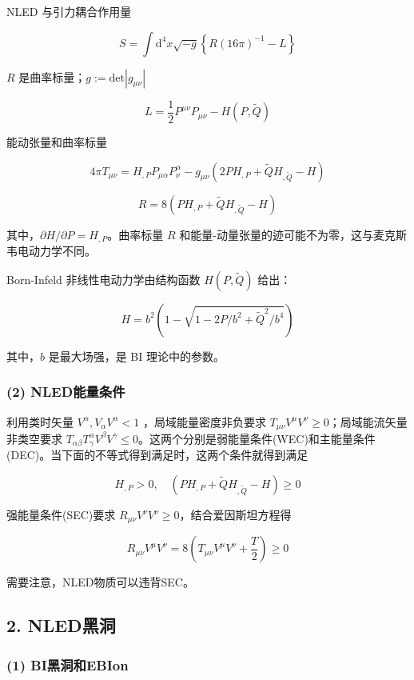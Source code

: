 \documentclass[aps,prl,preprint,groupedaddress]{revtex4-2}
\begin{document}
NLED 与引力耦合作用量

$$
S
=\int \mathrm{d}^4 x\sqrt{-g} \left\{R(16\pi)^{-1}-L \right\}
$$

$R $ 是曲率标量；$g:=\mathrm{det}\left|g_{\mu\nu} \right| $

$$
L
=\frac{1 }{2 } P^{\mu\nu}P_{\mu\nu} - H\left(P,\tilde{Q} \right)
$$

能动张量和曲率标量

$$
4\pi T_{\mu\nu}
=H_{,P} P_{\mu\alpha} P_\nu^\alpha - g_{\mu\nu}\left(2P H_{,P} + \tilde{Q} H_{,\tilde{Q}} - H \right)
$$

$$
R
=8\left(P H_{,P} + \tilde{Q} H_{,\tilde{Q}} - H \right) 
$$

其中，$\partial H/\partial P = H_{,P} $。曲率标量 $R$ 和能量-动量张量的迹可能不为零，这与麦克斯韦电动力学不同。

Born-Infeld 非线性电动力学由结构函数 $H(P,\tilde{Q}) $ 给出：

$$
H = b^2\left(1-\sqrt{1-2P/b^2+\tilde{Q}^2/b^4} \right) 
$$

其中，$b $ 是最大场强，是 BI 理论中的参数。

\subsubsection{(2) NLED能量条件}

利用类时矢量 $V^\alpha,V_\alpha V^\alpha<1 $ ，局域能量密度非负要求 $T_{\mu\nu}V^\mu V^\nu\geq 0 $；局域能流矢量非类空要求 $T_{\alpha\beta}T_\gamma^\alpha V^\beta V^\gamma\leq 0 $。这两个分别是弱能量条件(WEC)和主能量条件(DEC)。当下面的不等式得到满足时，这两个条件就得到满足

$$
H_{,P}>0,\quad
\left(P H_{,P} + \tilde{Q} H_{,\tilde{Q}} - H \right) \geq 0
$$

强能量条件(SEC)要求 $R_{\mu\nu}V^\nu V^\nu\geq 0 $，结合爱因斯坦方程得

$$
R_{\mu\nu}V^\mu V^\nu 
=8\left(T_{\mu\nu} V^\mu V^\nu + \frac{T }{2 }  \right) \geq 0
$$

需要注意，NLED物质可以违背SEC。

\subsection{2. NLED黑洞}

\subsubsection{(1) BI黑洞和EBIon}
\end{document}
